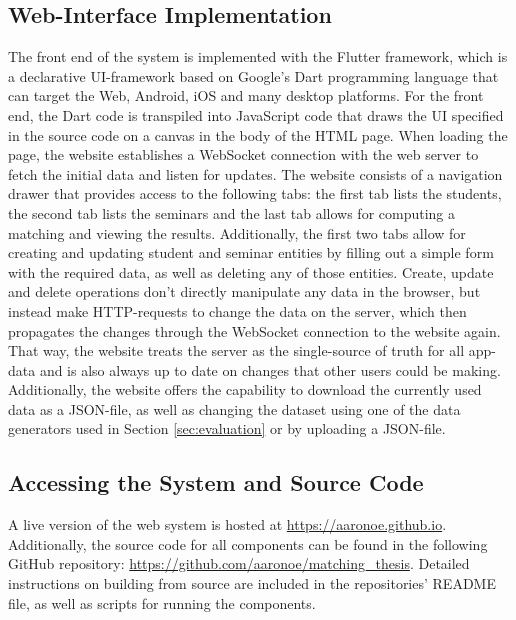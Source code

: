 \subsection{Web-Interface Implementation}
The front end of the system is implemented with the Flutter framework, which is a declarative UI-framework based on Google's Dart programming language that can target the Web, Android, iOS and many desktop platforms. For the front end, the Dart code is transpiled into JavaScript code that draws the UI specified in the source code on a canvas in the body of the HTML page. When loading the page, the website establishes a WebSocket connection with the web server to fetch the initial data and listen for updates. 
The website consists of a navigation drawer that provides access to the following tabs: the first tab lists the students, the second tab lists the seminars and the last tab allows for computing a matching and viewing the results. Additionally, the first two tabs allow for creating and updating student and seminar entities by filling out a simple form with the required data, as well as deleting any of those entities. Create, update and delete operations don't directly manipulate any data in the browser, but instead make HTTP-requests to change the data on the server, which then propagates the changes through the WebSocket connection to the website again. That way, the website treats the server as the single-source of truth for all app-data and is also always up to date on changes that other users could be making. Additionally, the website offers the capability to download the currently used data as a JSON-file, as well as changing the dataset using one of the data generators used in Section \ref{sec:evaluation} or by uploading a JSON-file.

\subsection{Accessing the System and Source Code}
A live version of the web system is hosted at \url{https://aaronoe.github.io}. Additionally, the source code for all components can be found in the following GitHub repository: \url{https://github.com/aaronoe/matching_thesis}. Detailed instructions on building from source are included in the repositories' README file, as well as scripts for running the components.